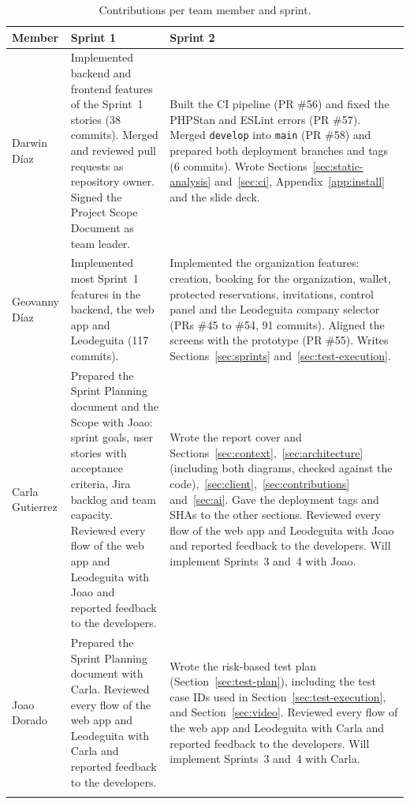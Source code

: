 \begin{longtable}{@{}L{2.2cm}L{6.2cm}L{6.3cm}@{}}
  \toprule
  Member & Sprint 1 & Sprint 2 \\
  \midrule
  \endhead
  Darwin Díaz &
    Implemented backend and frontend features of the Sprint~1 stories (38 commits).
    Merged and reviewed pull requests as repository owner.
    Signed the Project Scope Document as team leader. &
    Built the CI pipeline (PR \#56) and fixed the PHPStan and ESLint errors (PR \#57).
    Merged \texttt{develop} into \texttt{main} (PR \#58) and prepared both deployment branches and tags (6 commits).
    Wrote Sections~\ref{sec:static-analysis} and~\ref{sec:ci}, Appendix~\ref{app:install} and the slide deck. \\
  Geovanny Díaz &
    Implemented most Sprint~1 features in the backend, the web app and Leodeguita (117 commits). &
    Implemented the organization features: creation, booking for the organization, wallet, protected reservations, invitations, control panel and the Leodeguita company selector (PRs \#45 to \#54, 91 commits).
    Aligned the screens with the prototype (PR \#55).
    Writes Sections~\ref{sec:sprints} and~\ref{sec:test-execution}. \\
  Carla Gutierrez &
    Prepared the Sprint Planning document and the Scope with Joao: sprint goals, user stories with acceptance criteria, Jira backlog and team capacity.
    Reviewed every flow of the web app and Leodeguita with Joao and reported feedback to the developers. &
    Wrote the report cover and Sections~\ref{sec:context},~\ref{sec:architecture} (including both diagrams, checked against the code),~\ref{sec:client},~\ref{sec:contributions} and~\ref{sec:ai}.
    Gave the deployment tags and SHAs to the other sections.
    Reviewed every flow of the web app and Leodeguita with Joao and reported feedback to the developers.
    Will implement Sprints~3 and~4 with Joao. \\
  Joao Dorado &
    Prepared the Sprint Planning document with Carla.
    Reviewed every flow of the web app and Leodeguita with Carla and reported feedback to the developers. &
    Wrote the risk-based test plan (Section~\ref{sec:test-plan}), including the test case IDs used in Section~\ref{sec:test-execution}, and Section~\ref{sec:video}.
    Reviewed every flow of the web app and Leodeguita with Carla and reported feedback to the developers.
    Will implement Sprints~3 and~4 with Carla. \\
  \bottomrule
  \caption{Contributions per team member and sprint.}
  \label{tab:contributions}
\end{longtable}
